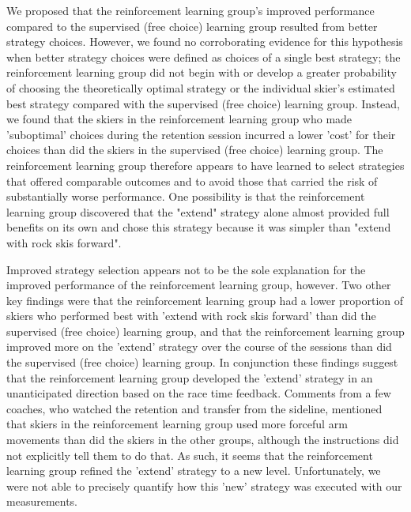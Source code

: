 \documentclass[pdflatex,sn-nature]{sn-jnl}%
\theoremstyle{thmstyleone}%
\theoremstyle{thmstyletwo}%
\theoremstyle{thmstylethree}%
\begin{document}
We proposed that the reinforcement learning group's improved performance compared to the supervised (free choice) learning group resulted from better strategy choices. However, we found no corroborating evidence for this hypothesis when better strategy choices were defined as choices of a single best strategy; the reinforcement learning group did not begin with or develop a greater probability of choosing the theoretically optimal strategy or the individual skier's estimated best strategy compared with the supervised (free choice) learning group. Instead, we found that the skiers in the reinforcement learning group who made 'suboptimal' choices during the retention session incurred a lower 'cost' for their choices than did the skiers in the supervised (free choice) learning group. The reinforcement learning group therefore appears to have learned to select strategies that offered comparable outcomes and to avoid those that carried the risk of substantially worse performance. One possibility is that the reinforcement learning group discovered that the "extend" strategy alone almost provided full benefits on its own and chose this strategy because it was simpler than "extend with rock skis forward".

Improved strategy selection appears not to be the sole explanation for the improved performance of the reinforcement learning group, however. Two other key findings were that the reinforcement learning group had a lower proportion of skiers who performed best with 'extend with rock skis forward' than did the supervised (free choice) learning group, and that the reinforcement learning group improved more on the 'extend' strategy over the course of the sessions than did the supervised (free choice) learning group. In conjunction these findings suggest that the reinforcement learning group developed the 'extend' strategy in an unanticipated direction based on the race time feedback. Comments from a few coaches, who watched the retention and transfer from the sideline, mentioned that skiers in the reinforcement learning group used more forceful arm movements than did the skiers in the other groups, although the instructions did not explicitly tell them to do that. As such, it seems that the reinforcement learning group refined the 'extend' strategy to a new level. Unfortunately, we were not able to precisely quantify how this 'new' strategy was executed with our measurements.
\end{document}
